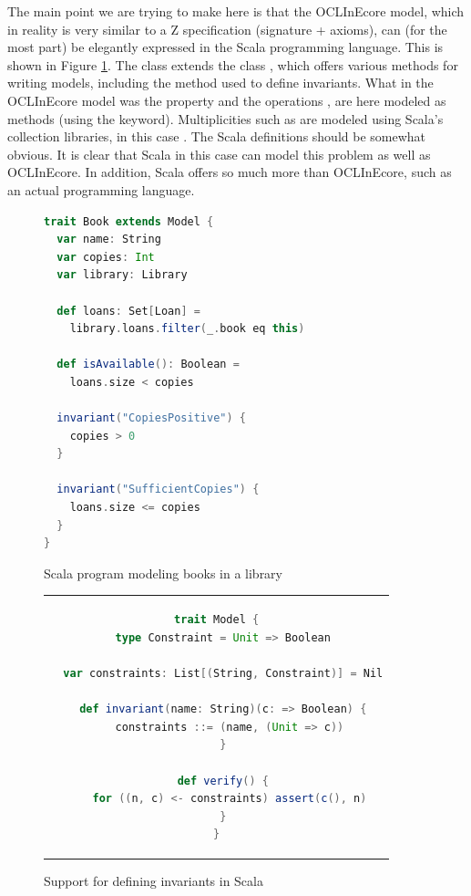 The main point we are trying to make here is that the OCLInEcore 
model, which in reality is very similar to a Z specification 
(signature + axioms), can (for the most part) be elegantly 
expressed in the Scala programming language. This is shown in 
Figure \ref{fig:book-scala}. The class  extends the
class , which offers various methods for writing 
models, including the  method used to define 
invariants. What in the OCLInEcore model was the property 
 and the operations , are here 
modeled as methods (using the  keyword). 
Multiplicities such as  are modeled using Scala's 
collection libraries, in this case . The Scala 
definitions should be somewhat obvious. It is clear that Scala in 
this case can model this problem as well as OCLInEcore. In 
addition, Scala offers so much more than OCLInEcore, such as an 
actual programming language.

\begin{figure}
\begin{lstlisting}[language=scala,frame=single]
trait Book extends Model {
  var name: String
  var copies: Int
  var library: Library

  def loans: Set[Loan] =
    library.loans.filter(_.book eq this)

  def isAvailable(): Boolean =
    loans.size < copies

  invariant("CopiesPositive") {
    copies > 0
  }

  invariant("SufficientCopies") {
    loans.size <= copies
  }
}
\end{lstlisting}
\caption{Scala program modeling books in a library}
\label{fig:book-scala}
\end{figure}

\begin{figure}[htb]
\begin{center}
\begin{tabular}{c}
\begin{lstlisting}[language=scala]
trait Model {
  type Constraint = Unit => Boolean

  var constraints: List[(String, Constraint)] = Nil

  def invariant(name: String)(c: => Boolean) {
    constraints ::= (name, (Unit => c))
  }

  def verify() {
    for ((n, c) <- constraints) assert(c(), n)
  }
}
\end{lstlisting}
\end{tabular}
\end{center}
\caption{Support for defining invariants in Scala}
\label{fig:invariant-scala}
\end{figure}

